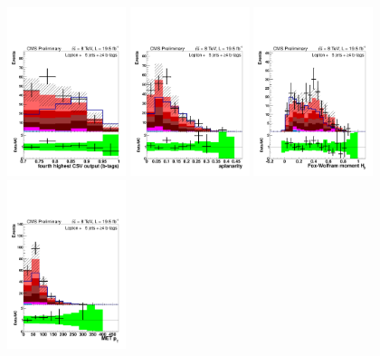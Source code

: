 \begin{figure}[hbtp]
\begin{center}
   \includegraphics[width=0.31\textwidth]{Figures/Analysis_2_Diagrams/LJ_plots_lep/5j4t/lep_jet_csv_4_5j4t_cumulative_wRatio_noLegend_lin.pdf}
   \includegraphics[width=0.31\textwidth]{Figures/Analysis_2_Diagrams/LJ_plots_lep/5j4t/lep_aplanarity_5j4t_cumulative_wRatio_noLegend_lin.pdf}
   \includegraphics[width=0.31\textwidth]{Figures/Analysis_2_Diagrams/LJ_plots_lep/5j4t/lep_h3_5j4t_cumulative_wRatio_noLegend_lin.pdf}
   \includegraphics[width=0.31\textwidth]{Figures/Analysis_2_Diagrams/LJ_plots_lep/5j4t/lep_met_pt_5j4t_cumulative_wRatio_noLegend_lin.pdf}

\end{center}
\end{figure}
